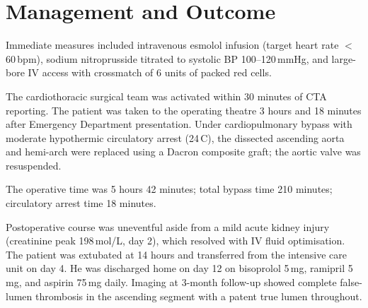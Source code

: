 \section{Management and Outcome}

Immediate measures included intravenous esmolol infusion (target heart rate $<$60\,bpm),
sodium nitroprusside titrated to systolic BP 100--120\,mmHg, and large-bore IV access with
crossmatch of 6 units of packed red cells.

The cardiothoracic surgical team was activated within 30 minutes of CTA reporting. The patient
was taken to the operating theatre 3 hours and 18 minutes after Emergency Department
presentation. Under cardiopulmonary bypass with moderate hypothermic circulatory arrest
(24\,\textdegree C), the dissected ascending aorta and hemi-arch were replaced using a
Dacron composite graft; the aortic valve was resuspended.

The operative time was 5 hours 42 minutes; total bypass time 210 minutes; circulatory arrest
time 18 minutes.

Postoperative course was uneventful aside from a mild acute kidney injury (creatinine peak
198\,\textmu mol/L, day 2), which resolved with IV fluid optimisation. The patient was
extubated at 14 hours and transferred from the intensive care unit on day 4. He was discharged
home on day 12 on bisoprolol 5\,mg, ramipril 5\,mg, and aspirin 75\,mg daily. Imaging at
3-month follow-up showed complete false-lumen thrombosis in the ascending segment with a
patent true lumen throughout.

